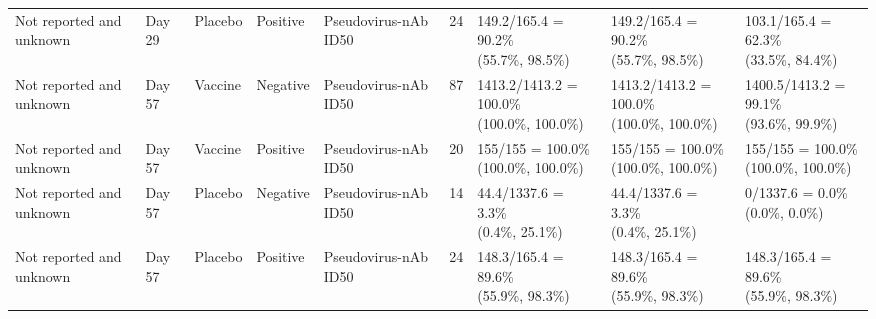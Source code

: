 \documentclass[]{book}
\theoremstyle{definition}
\theoremstyle{definition}
\theoremstyle{definition}
\newcommand{\1}{\mathbbm{1}}
\begin{document}
\begin{landscape}
\begin{ThreePartTable}
\begin{longtable}[t]{>{\raggedright\arraybackslash}p{2.7cm}llllllll}
\hspace{1em}Not reported and unknown & Day 29 & Placebo & Positive & Pseudovirus-nAb ID50 & 24 & \makecell[l]{149.2/165.4 = 90.2\%\\(55.7\%, 98.5\%)} & \makecell[l]{149.2/165.4 = 90.2\%\\(55.7\%, 98.5\%)} & \makecell[l]{103.1/165.4 = 62.3\%\\(33.5\%, 84.4\%)}\\
\hspace{1em}Not reported and unknown & Day 57 & Vaccine & Negative & Pseudovirus-nAb ID50 & 87 & \makecell[l]{1413.2/1413.2 = 100.0\%\\(100.0\%, 100.0\%)} & \makecell[l]{1413.2/1413.2 = 100.0\%\\(100.0\%, 100.0\%)} & \makecell[l]{1400.5/1413.2 = 99.1\%\\(93.6\%, 99.9\%)}\\
\hspace{1em}Not reported and unknown & Day 57 & Vaccine & Positive & Pseudovirus-nAb ID50 & 20 & \makecell[l]{155/155 = 100.0\%\\(100.0\%, 100.0\%)} & \makecell[l]{155/155 = 100.0\%\\(100.0\%, 100.0\%)} & \makecell[l]{155/155 = 100.0\%\\(100.0\%, 100.0\%)}\\
\hspace{1em}Not reported and unknown & Day 57 & Placebo & Negative & Pseudovirus-nAb ID50 & 14 & \makecell[l]{44.4/1337.6 = 3.3\%\\(0.4\%, 25.1\%)} & \makecell[l]{44.4/1337.6 = 3.3\%\\(0.4\%, 25.1\%)} & \makecell[l]{0/1337.6 = 0.0\%\\(0.0\%, 0.0\%)}\\
\hspace{1em}Not reported and unknown & Day 57 & Placebo & Positive & Pseudovirus-nAb ID50 & 24 & \makecell[l]{148.3/165.4 = 89.6\%\\(55.9\%, 98.3\%)} & \makecell[l]{148.3/165.4 = 89.6\%\\(55.9\%, 98.3\%)} & \makecell[l]{148.3/165.4 = 89.6\%\\(55.9\%, 98.3\%)}\\*
\end{longtable}
\end{ThreePartTable}


\clearpage


\end{landscape}
\end{document}
